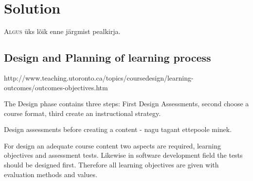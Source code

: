 \chapter{Solution}
\label{solution}

\lettrine[lraise=0.1, nindent=0em, slope=-.5em]{\color{Violet}A}{lgus} üks lõik enne järgmist pealkirja.

\section{Design and Planning of learning process}

http://www.teaching.utoronto.ca/topics/coursedesign/learning-outcomes/outcomes-objectives.htm




The Design phase contains three steps: First Design Assessments, second choose a course format, third create an instructional strategy.

Design assessments before creating a content - nagu tagant ettepoole minek.

For design an adequate course content two aspects are required, learning objectives and assessment tests. Likewise in software development field the tests should be designed first. Therefore all learning objectives are given with evaluation methods and values.  



